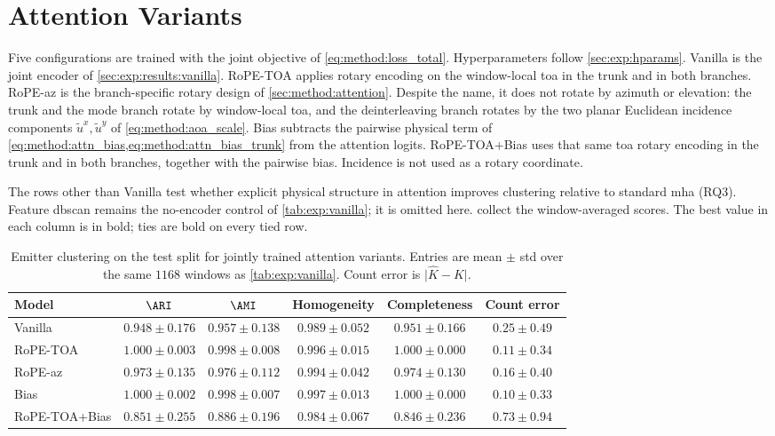 \section{Attention Variants}\label{sec:exp:attention}\label{sec:exp:results:attention}

Five configurations are trained with the joint objective of \cref{eq:method:loss_total}.
Hyperparameters follow \cref{sec:exp:hparams}.
Vanilla is the joint encoder of \cref{sec:exp:results:vanilla}.
RoPE-TOA applies rotary encoding on the window-local \gls{toa} in the trunk and in both branches.
RoPE-az is the branch-specific rotary design of \cref{sec:method:attention}.
Despite the name, it does not rotate by azimuth or elevation: the trunk and the mode branch rotate by window-local \gls{toa}, and the deinterleaving branch rotates by the two planar Euclidean incidence components $\tilde{u}^{x},\tilde{u}^{y}$ of \cref{eq:method:aoa_scale}.
Bias subtracts the pairwise physical term of \cref{eq:method:attn_bias,eq:method:attn_bias_trunk} from the attention logits.
RoPE-TOA+Bias uses that same \gls{toa} rotary encoding in the trunk and in both branches, together with the pairwise bias.
Incidence is not used as a rotary coordinate.

The rows other than Vanilla test whether explicit physical structure in attention improves clustering relative to standard \gls{mha} (RQ3).
Feature \gls{dbscan} remains the no-encoder control of \cref{tab:exp:vanilla}; it is omitted here.
 collect the window-averaged scores.
The best value in each column is in bold; ties are bold on every tied row.

\begin{table}[tbp]
  \centering
  \small
  \caption{Emitter clustering on the test split for jointly trained attention variants. Entries are mean $\pm$ std over the same $1168$ windows as \cref{tab:exp:vanilla}. Count error is $\lvert\hat{K}-K\rvert$.}
  \label{tab:exp:attn_em}
  \begin{tabular}{@{}lccccc@{}}
    \toprule
    Model & $\ARI$ & $\AMI$ & Homogeneity & Completeness & Count error \\
    \midrule
    Vanilla   & $0.948\pm0.176$ & $0.957\pm0.138$ & $0.989\pm0.052$ & $0.951\pm0.166$ & $0.25\pm0.49$ \\
    RoPE-TOA  & $\mathbf{1.000\pm0.003}$ & $\mathbf{0.998\pm0.008}$ & $0.996\pm0.015$ & $\mathbf{1.000\pm0.000}$ & $0.11\pm0.34$ \\
    RoPE-az   & $0.973\pm0.135$ & $0.976\pm0.112$ & $0.994\pm0.042$ & $0.974\pm0.130$ & $0.16\pm0.40$ \\
    Bias      & $\mathbf{1.000\pm0.002}$ & $\mathbf{0.998\pm0.007}$ & $\mathbf{0.997\pm0.013}$ & $\mathbf{1.000\pm0.000}$ & $\mathbf{0.10\pm0.33}$ \\
    RoPE-TOA+Bias & $0.851\pm0.255$ & $0.886\pm0.196$ & $0.984\pm0.067$ & $0.846\pm0.236$ & $0.73\pm0.94$ \\
    \bottomrule
  \end{tabular}
\end{table}

